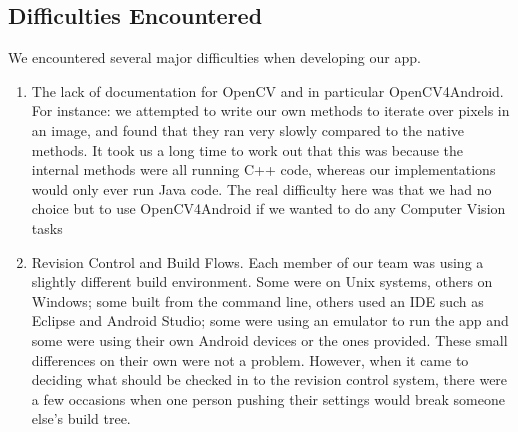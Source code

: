     \subsection{Difficulties Encountered}
    We encountered several major difficulties when developing our app.
    \begin{enumerate}
        \item{The lack of documentation for OpenCV and in particular OpenCV4Android. For instance: we attempted to write our own methods to iterate over pixels in an image, and found that they ran very slowly compared to the native methods. It took us a long time to work out that this was because the internal methods were all running C++ code, whereas our implementations would only ever run Java code. The real difficulty here was that we had no choice but to use
            OpenCV4Android if we wanted to do any Computer Vision tasks}
    \item{Revision Control and Build Flows. Each member of our team was using a slightly different build environment. Some were on Unix systems, others on Windows; some built from the command line, others used an IDE such as Eclipse and Android Studio; some were using an emulator to run the app and some were using their own Android devices or the ones provided. These small differences on their own were not a problem. However, when it came to deciding what should be checked in
            to the revision control system, there were a few occasions when one person pushing their settings would break someone else's build tree.} 



    \end{enumerate}


